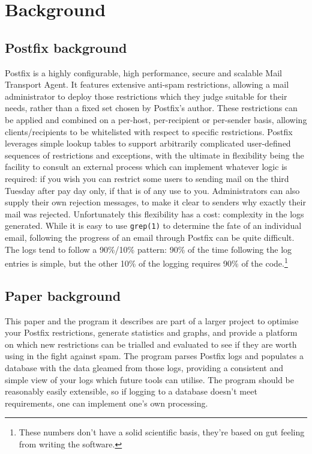 \documentclass[a4paper,12pt,draft]{article}
\begin{document}
\section{Background}

\subsection{Postfix background}

Postfix is a highly configurable, high performance, secure and scalable
Mail Transport Agent.  It features extensive anti-spam restrictions,
allowing a mail administrator to deploy those restrictions which they judge
suitable for their needs, rather than a fixed set chosen by Postfix's
author.  These restrictions can be applied and combined on a per-host,
per-recipient or per-sender basis, allowing clients/recipients to be
whitelisted with respect to specific restrictions.  Postfix leverages
simple lookup tables to support arbitrarily complicated user-defined
sequences of restrictions and exceptions, with the ultimate in flexibility
being the facility to consult an external process which can implement
whatever logic is required: if you wish you can restrict some users to
sending mail on the third Tuesday after pay day only, if that is of any use
to you.  Administrators can also supply their own rejection messages, to
make it clear to senders why exactly their mail was rejected.
Unfortunately this flexibility has a cost: complexity in the logs
generated.  While it is easy to use \texttt{grep(1)} to determine the fate
of an individual email, following the progress of an email through Postfix
can be quite difficult.  The logs tend to follow a 90\%/10\% pattern: 90\%
of the time following the log entries is simple, but the other 10\% of the
logging requires 90\% of the code.\footnote{These numbers don't have a
solid scientific basis, they're based on gut feeling from writing the
software.}

\subsection{Paper background}

This paper and the program it describes are part of a larger project to
optimise your Postfix restrictions, generate statistics and graphs, and
provide a platform on which new restrictions can be trialled and evaluated
to see if they are worth using in the fight against spam.  The program
parses Postfix logs and populates a database with the data gleamed from
those logs, providing a consistent and simple view of your logs which
future tools can utilise.  The program should be reasonably easily
extensible, so if logging to a database doesn't meet requirements, one
can implement one's own processing.
\end{document}
